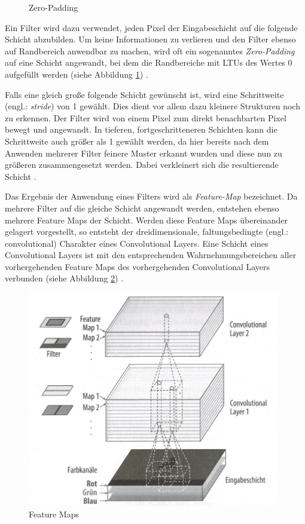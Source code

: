 \begin{figure}
\begin{minipage}[b]{.4\linewidth}
		\caption[Zero-Padding]{Zero-Padding \cite{AbhineetSaxena.20160629}}
		\label{zero_padding}
	\end{minipage}
\end{figure}

Ein Filter wird dazu verwendet, jeden Pixel der Eingabeschicht auf die folgende Schicht abzubilden. Um keine Informationen zu verlieren und den Filter ebenso auf Randbereich anwendbar zu machen, wird oft ein sogenanntes \textit{Zero-Padding} auf eine Schicht angewandt, bei dem die Randbereiche mit LTUs des Wertes 0 aufgefüllt werden (siehe Abbildung \ref{zero_padding}) \cite{AurelienGeron.2018}.

Falls eine gleich große folgende Schicht gewünscht ist, wird eine Schrittweite (engl.: \textit{stride}) von 1 gewählt. Dies dient vor allem dazu kleinere Strukturen noch zu erkennen. Der Filter wird von einem Pixel zum direkt benachbarten Pixel bewegt und angewandt. In tieferen, fortgeschritteneren Schichten kann die Schrittweite auch größer als 1 gewählt werden, da hier bereits nach dem Anwenden mehrerer Filter feinere Muster erkannt wurden und diese nun zu größeren zusammengesetzt werden. Dabei verkleinert sich die resultierende Schicht \cite{AurelienGeron.2018}.

Das Ergebnis der Anwendung eines Filters wird als \textit{Feature-Map} bezeichnet. Da mehrere Filter auf die gleiche Schicht angewandt werden, entstehen ebenso mehrere Feature Maps der Schicht. Werden diese Feature Maps übereinander gelagert vorgestellt, so entsteht der dreidimensionale, \glqq faltungsbedingte\grqq{} (engl.: convolutional) Charakter eines Convolutional Layers. Eine Schicht eines Convolutional Layers ist mit den entsprechenden Wahrnehmungsbereichen aller vorhergehenden Feature Maps des vorhergehenden Convolutional Layers verbunden (siehe Abbildung \ref{feature_maps}) \cite{AurelienGeron.2018}.

\begin{figure}[ht]
	\begin{center}
		\includegraphics[width=11cm]{Bilder/feature_maps.jpeg} 
		\caption[Feature Maps]{Feature Maps \cite{AurelienGeron.2018}}
		\label{feature_maps}
	\end{center}
\end{figure}

